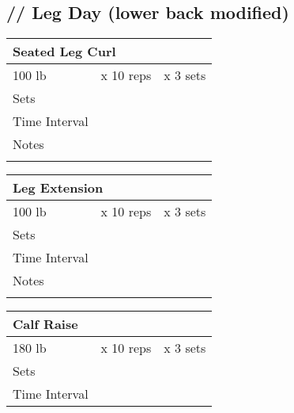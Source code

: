 \documentclass{article}
\begin{document}
\begin{center}

    \section*{\hspace{.5cm}/\hspace{.5cm}/\hspace{.5cm} Leg Day (lower back modified)}

    
{\setlength{\extrarowheight}{10pt}%
    \begin{tabularx}{\textwidth}{|X|X|X|}
        \hline
        \multicolumn{3}{|X|}{Seated Leg Curl} \\
        \hline
        100 lb & x 10 reps & x 3 sets \\
        \hline
        Sets & \multicolumn{2}{|X|}{ } \\
        \hline
        Time Interval & \multicolumn{2}{|X|}{ } \\
        \hline
        Notes & \multicolumn{2}{c|}{} \\
              & \multicolumn{2}{c|}{} \\
        \hline
    \end{tabularx}}
\vspace{0.25cm}
{\setlength{\extrarowheight}{10pt}%
    \begin{tabularx}{\textwidth}{|X|X|X|}
        \hline
        \multicolumn{3}{|X|}{Leg Extension} \\
        \hline
        100 lb & x 10 reps & x 3 sets \\
        \hline
        Sets & \multicolumn{2}{|X|}{ } \\
        \hline
        Time Interval & \multicolumn{2}{|X|}{ } \\
        \hline
        Notes & \multicolumn{2}{c|}{} \\
              & \multicolumn{2}{c|}{} \\
        \hline
    \end{tabularx}}
\vspace{0.25cm}
{\setlength{\extrarowheight}{10pt}%
    \begin{tabularx}{\textwidth}{|X|X|X|}
        \hline
        \multicolumn{3}{|X|}{Calf Raise} \\
        \hline
        180 lb & x 10 reps & x 3 sets \\
        \hline
        Sets & \multicolumn{2}{|X|}{ } \\
        \hline
        Time Interval & \multicolumn{2}{|X|}{ } \\

\end{tabularx}}
\end{center}
\end{document}
